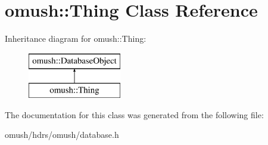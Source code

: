 \hypertarget{classomush_1_1_thing}{\section{omush\-:\-:Thing Class Reference}
\label{classomush_1_1_thing}
}
Inheritance diagram for omush\-:\-:Thing\-:\begin{figure}[H]
\begin{center}
\leavevmode
\includegraphics[height=2.000000cm]{classomush_1_1_thing}
\end{center}
\end{figure}


The documentation for this class was generated from the following file\-:\begin{DoxyCompactItemize}
\item 
omush/hdrs/omush/database.\-h\end{DoxyCompactItemize}
